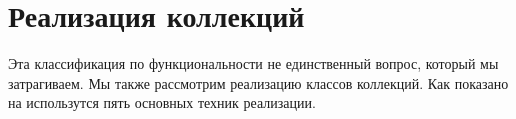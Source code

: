 \documentclass[a4paper,10pt,twoside]{book}
\begin{document}
\section{Реализация коллекций}

\begin{figure*}
\begin{center}
\texttt{[image: CollectionsByImpl]}
    }
\end{center}
\end{figure*}

Эта классификация по функциональности не единственный вопрос, который мы затрагиваем. Мы также рассмотрим реализацию классов коллекций. Как показано на  использутся пять основных техник реализации.
\end{document}
